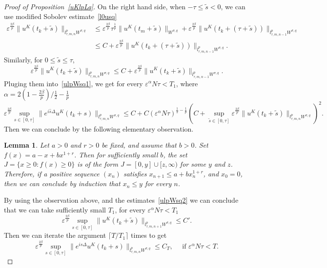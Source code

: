 \documentclass[10pt,a4paper]{article}
\newtheorem{lemma}[theorem]{Lemma}
\begin{document}
\begin{proof}[Proof of Proposition~\ref{uKlpLq}]
    On the right hand side, when \(-\tau \leq \tilde s<0\), we can use modified Sobolev 
    estimate~\eqref{l0usq}
    \begin{equation*}
      \begin{aligned}
        \varepsilon^{\frac{2\beta}p} \|u^K(t_k+\tilde{s})\|_{l^p_{\tau,m,n}W^{\sigma,q}}
        &\leq \varepsilon^{\frac{2\beta}p} \tau^\frac1p \|u^K(t_m+\tilde{s})\|_{W^{\sigma,q}}
        + \varepsilon^{\frac{2\beta}p} \|u^K(t_k+(\tau+\tilde{s}))\|_{l^p_{\tau,m,n-1}W^{\sigma,q}} \\
        &\leq C + \varepsilon^{\frac{2\beta}p} \|u^K(t_k+(\tau+\tilde{s}))\|_{l^p_{\tau,m,n-1}W^{\sigma,q}}.
      \end{aligned}
    \end{equation*}
    Similarly, for \( 0\leq\tilde{s}\leq \tau\), 
    \[
      \varepsilon^{\frac{2\beta}p} \|u^K(t_k+\tilde{s})\|_{l^p_{\tau,m,n}W^{\sigma,q}}
      \leq C + \varepsilon^{\frac{2\beta}p} \|u^K(t_k+\tilde{s})\|_{l^p_{\tau,m,n-1}W^{\sigma,q}}.
    \]
    Pluging them into~\eqref{ulpWsq1}, we get for every \(\varepsilon^\alpha N \tau <
    T_1 \), where \(\alpha = {2(1-\frac{2\beta}p)}/{\frac12-\frac1p}\)
    \begin{equation}\label{ulpWsq2}
      \varepsilon^{\frac{2\beta}p}\sup_{s\in[0,\tau]}\|e^{i\hat s\Delta}u^K(t_k+s)\|_{l^p_{\tau,m,n}W^{\sigma,q}} 
      \leq C + C (\varepsilon^\alpha N\tau)^{\frac12-\frac1p}
      \left(C + \sup_{\tilde{s} \in [0, \tau]} \varepsilon^{\frac{2\beta}p}
      \|u^K(t_k+\tilde{s})\|_{l^p_{\tau,m,n}W^{\sigma,q}}\right)^2.
    \end{equation}
    Then we can conclude by the following elementary observation. 

    \begin{lemma}\label{observation}
      Let \(a>0\) and \(r>0\) be fixed, and assume that \(b>0\). Set
      \(f(x)=a-x+bx^{1+r}\). Then for sufficiently small \(b\), the set 
      \(J = \{x\geq0:f(x)\geq0\}\) is of the form \(J=[0,y]\cup[z,\infty)\) for
      some \(y\) and \(z\). Therefore, if a positive sequence \((x_n)\) satisfies 
      \(x_{n+1} \leq a + b x_n^{1+r}\), and \(x_0=0\), then we can conclude by
      induction that \(x_n\leq y\) for every \(n\).
    \end{lemma}

    By using the observation above, and the estimates~\eqref{ulpWsq2} 
    we can conclude that we can take sufficiently small \(T_1\), for every
    \(\varepsilon^\alpha N\tau < T_1\) 
    \[ \varepsilon^{\frac{2\beta}p} \sup_{s\in[0,\tau]} \|u^K(t_k+\tilde{s})\|_{l^p_{\tau,m,n+1}W^{\sigma,q}} \leq C'.\]
    Then we can iterate the argument \( \lceil T/T_1 \rceil \) times to get
    \[ \varepsilon^{\frac{2\beta}p} \sup_{s\in[0,\tau]} \|e^{i\hat{s}\Delta}u^K(t_k+s)\|_{l^p_{\tau,m,n}W^{\sigma,q}}
      \leq C_T,\quad \text{ if } \varepsilon^\alpha N\tau < T. \]
  \end{proof}
  
\end{document}
